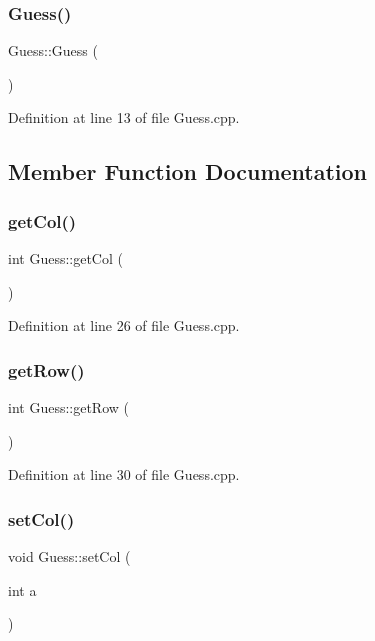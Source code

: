 \subsubsection{\texorpdfstring{Guess()}{Guess()}}
{\footnotesize\ttfamily Guess\+::\+Guess (\begin{DoxyParamCaption}{ }\end{DoxyParamCaption})}



Definition at line 13 of file Guess.\+cpp.



\subsection{Member Function Documentation}
\mbox{\label{class_guess_ad8d68e38d81479d605977331a0e57a0a}} 
\subsubsection{\texorpdfstring{get\+Col()}{getCol()}}
{\footnotesize\ttfamily int Guess\+::get\+Col (\begin{DoxyParamCaption}{ }\end{DoxyParamCaption})}



Definition at line 26 of file Guess.\+cpp.

\mbox{\label{class_guess_a9310375abd6a91897d51e0c78eb2d7c7}} 
\subsubsection{\texorpdfstring{get\+Row()}{getRow()}}
{\footnotesize\ttfamily int Guess\+::get\+Row (\begin{DoxyParamCaption}{ }\end{DoxyParamCaption})}



Definition at line 30 of file Guess.\+cpp.

\mbox{\label{class_guess_a2283979520b0e7d4922241aa92f0917b}} 
\subsubsection{\texorpdfstring{set\+Col()}{setCol()}}
{\footnotesize\ttfamily void Guess\+::set\+Col (\begin{DoxyParamCaption}\item[{int}]{a }\end{DoxyParamCaption})}



